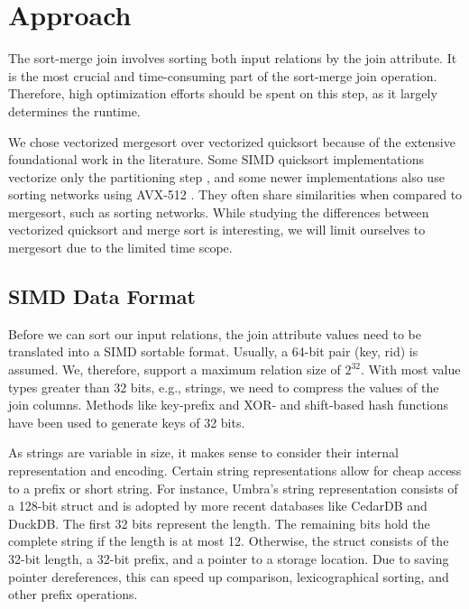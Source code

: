 \section{Approach}
\label{sec:approach}


The sort-merge join involves sorting both input relations by the join attribute. It is the most crucial and 
time-consuming part of the sort-merge join operation. Therefore, high optimization efforts should
be spent on this step, as it largely determines the runtime. 

We chose vectorized mergesort over vectorized quicksort because of the extensive foundational work in 
the literature. Some SIMD quicksort implementations vectorize only the partitioning step \cite{DBLP:journals/cj/GueronK16},
and some newer implementations also use sorting networks using AVX-512 \cite{Bramas}. They often share
similarities when compared to mergesort, such as sorting networks. While studying the differences
between vectorized quicksort and merge sort is interesting, we will limit ourselves to mergesort
due to the limited time scope. 

\subsection{SIMD Data Format}
Before we can sort our input relations, the join attribute values need to be translated into a SIMD sortable
format. Usually, a 64-bit pair (key, rid) is assumed. We, therefore,
support a maximum relation size of $2^{32}$. With most value types greater
than 32 bits, e.g., strings, we need to compress the values of the join columns. Methods like 
key-prefix \cite{chris_nyberg__1994} and XOR- and shift-based hash functions \cite{1319989} have 
been used to generate keys of 32 bits.

As strings are variable in size, it makes sense to consider their internal representation and
encoding. Certain string representations allow for cheap access to a prefix or short string.
For instance, Umbra's string representation \cite{DBLP:conf/cidr/NeumannF20} consists of a 128-bit 
struct and is adopted by more recent databases like CedarDB and DuckDB. The first 32 bits represent 
the length. The remaining bits hold
the complete string if the length is at most 12. Otherwise, the struct consists of the 32-bit
length, a 32-bit prefix, and a pointer to a storage location. Due to saving pointer dereferences,
this can speed up comparison, lexicographical sorting, and other prefix operations.



